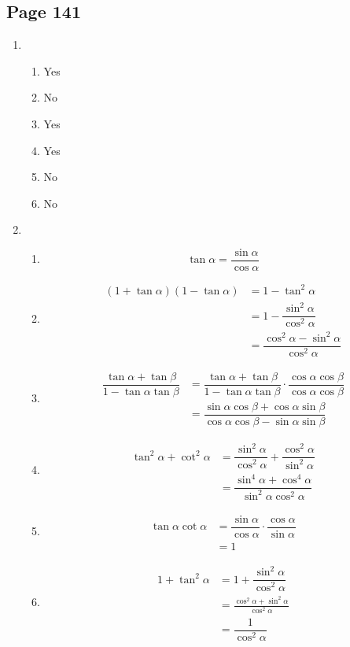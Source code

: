 \documentclass{article}
\newenvironment{solutions}[1]
{\subsection*{#1}
 \begin{enumerate}[leftmargin=1.5em]}
{\end{enumerate}}
\newcommand{\solution}{\item}
\newenvironment{subsolutions}
{\begin{enumerate}}
{\end{enumerate}}
\newcommand{\subsolution}{\item}
\begin{document}
\begin{solutions}{Page 141}
\solution %
\begin{subsolutions}
\subsolution %
Yes
\subsolution %
No
\subsolution %
Yes
\subsolution %
Yes
\subsolution %
No
\subsolution %
No
\end{subsolutions}
\solution %
\begin{subsolutions}
\subsolution %
\[
\tan{\alpha} = \dfrac{\sin{\alpha}}{\cos{\alpha}}
\]

\subsolution %
\begin{align*}
\left(1+\tan{\alpha}\right)\left(1-\tan{\alpha}\right) &= 1-\tan^{2}{\alpha} \\
&= 1- \dfrac{\sin^{2}{\alpha}}{\cos^{2}{\alpha}} \\
&= \dfrac{\cos^{2}{\alpha}-\sin^{2}{\alpha}}{\cos^{2}{\alpha}}
\end{align*}

\subsolution %
\begin{align*}
\dfrac{\tan{\alpha}+\tan{\beta}}{1-\tan{\alpha}\tan{\beta}} &= \dfrac{\tan{\alpha}+\tan{\beta}}{1-\tan{\alpha}\tan{\beta}} \cdot \dfrac{\cos{\alpha}\cos{\beta}}{\cos{\alpha}\cos{\beta}} \\
&= \dfrac{\sin{\alpha}\cos{\beta}+\cos{\alpha}\sin{\beta}}{\cos{\alpha}\cos{\beta}-\sin{\alpha}\sin{\beta}} %
\end{align*}

\subsolution %
\begin{align*}
\tan^{2}{\alpha}+\cot^{2}{\alpha} &= \dfrac{\sin^{2}{\alpha}}{\cos^{2}{\alpha}} + \dfrac{\cos^{2}{\alpha}}{\sin^{2}{\alpha}} \\
&= \dfrac{\sin^{4}{\alpha}+\cos^{4}{\alpha}}{\sin^{2}{\alpha}\cos^{2}{\alpha}}
\end{align*}

\subsolution %
\begin{align*}
\tan{\alpha}\cot{\alpha} &= \dfrac{\sin{\alpha}}{\cos{\alpha}} \cdot \dfrac{\cos{\alpha}}{\sin{\alpha}} \\
&= 1
\end{align*}

\subsolution %
\begin{align*}
1+\tan^{2}{\alpha} &= 1 + \dfrac{\sin^{2}{\alpha}}{\cos^{2}{\alpha}} \\
&= \frac{\cos^{2}{\alpha} + \sin^{2}{\alpha}}{\cos^{2}{\alpha}} \\
&= \dfrac{1}{\cos^{2}{\alpha}}
\end{align*}


\end{subsolutions}
\end{solutions}
\end{document}
